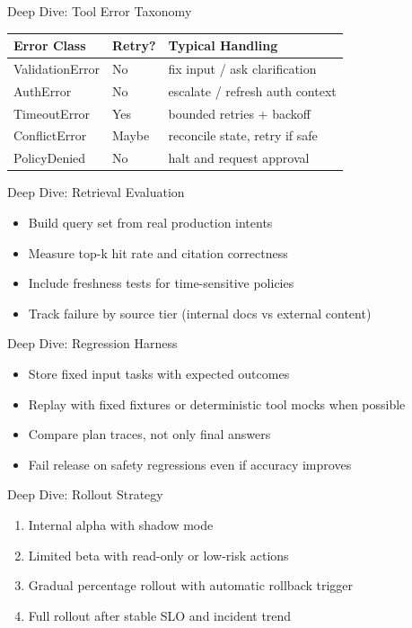 \documentclass[aspectratio=169]{beamer}
\begin{document}
\begin{frame}{Deep Dive: Tool Error Taxonomy}
  \begin{table}
    \small
    \begin{tabular}{@{}lll@{}}
      \toprule
      Error Class & Retry? & Typical Handling \\
      \midrule
      ValidationError & No & fix input / ask clarification \\
      AuthError & No & escalate / refresh auth context \\
      TimeoutError & Yes & bounded retries + backoff \\
      ConflictError & Maybe & reconcile state, retry if safe \\
      PolicyDenied & No & halt and request approval \\
      \bottomrule
    \end{tabular}
  \end{table}
\end{frame}

\begin{frame}{Deep Dive: Retrieval Evaluation}
  \begin{itemize}
    \item Build query set from real production intents
    \item Measure top-k hit rate and citation correctness
    \item Include freshness tests for time-sensitive policies
    \item Track failure by source tier (internal docs vs external content)
  \end{itemize}
\end{frame}

\begin{frame}{Deep Dive: Regression Harness}
  \begin{itemize}
    \item Store fixed input tasks with expected outcomes
    \item Replay with fixed fixtures or deterministic tool mocks when possible
    \item Compare plan traces, not only final answers
    \item Fail release on safety regressions even if accuracy improves
  \end{itemize}
\end{frame}

\begin{frame}{Deep Dive: Rollout Strategy}
  \begin{enumerate}
    \item Internal alpha with shadow mode
    \item Limited beta with read-only or low-risk actions
    \item Gradual percentage rollout with automatic rollback trigger
    \item Full rollout after stable SLO and incident trend
  \end{enumerate}
\end{frame}
\end{document}
